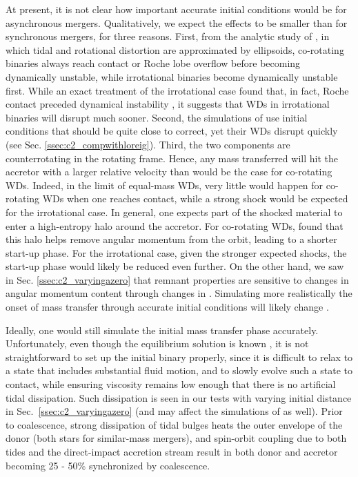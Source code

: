 At present, it is not clear how important accurate initial conditions would be for asynchronous mergers.  Qualitatively, we expect the effects to be smaller than for synchronous mergers, for three reasons.  First, from the analytic study of \cite{lairs94}, in which tidal and rotational distortion are approximated by ellipsoids, co-rotating binaries always reach contact or Roche lobe overflow before becoming dynamically unstable, while irrotational binaries become dynamically unstable first.  While an exact treatment of the irrotational case found that, in fact, Roche contact preceded dynamical instability \citep{uryue98}, it suggests that WDs in irrotational binaries will disrupt much sooner.  Second, the simulations of \citeal{loreig09} use initial conditions that should be quite close to correct, yet their WDs disrupt quickly (see Sec. \ref{ssec:c2_compwithloreig}).  Third, the two components are counterrotating in the rotating frame.  Hence, any mass transferred will hit the accretor with a larger relative velocity than would be the case for co-rotating WDs.  Indeed, in the limit of equal-mass WDs, very little would happen for co-rotating WDs when one reaches contact, while a strong shock would be expected for the irrotational case.  In general, one expects part of the shocked material to enter a high-entropy halo around the accretor.  For co-rotating WDs, \cite{dan+11} found that this halo helps remove angular momentum from the orbit, leading to a shorter start-up phase.  For the irrotational case, given the stronger expected shocks, the start-up phase would likely be reduced even further.  On the other hand, we saw in Sec. \ref{ssec:c2_varyingazero} that remnant properties are sensitive to changes in angular momentum content through changes in \azero.  Simulating more realistically the onset of mass transfer through accurate initial conditions will likely change \azero.

Ideally, one would still simulate the initial mass transfer phase accurately.  Unfortunately, even though the equilibrium solution is known \citep{uryue98}, it is not straightforward to set up the initial binary properly, since it is difficult to relax to a state that includes substantial fluid motion, and to slowly evolve such a state to contact, while ensuring viscosity remains low enough that there is no artificial tidal dissipation.  Such dissipation is seen in our tests with varying initial distance {\azero} in Sec.~\ref{ssec:c2_varyingazero} (and may affect the simulations of \citeal{loreig09} as well).  Prior to coalescence, strong dissipation of tidal bulges heats the outer envelope of the donor (both stars for similar-mass mergers), and spin-orbit coupling due to both tides and the direct-impact accretion stream result in both donor and accretor becoming 25 - 50\% synchronized by coalescence.

